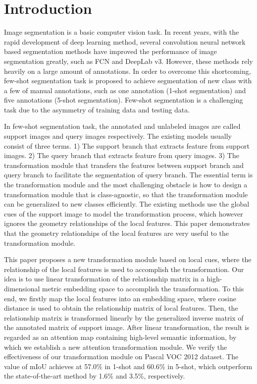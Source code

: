 \documentclass[runningheads]{llncs}
\begin{document}
\section{Introduction}

Image segmentation is a basic computer vision task\cite{ref_fcn}. In recent years, with the rapid development of deep learning method, several convolution neural network based segmentation methods have improved the performance of image segmentation greatly, such as FCN\cite{ref_fcn} and DeepLab v3\cite{ref_deeplab}. However, these methods rely heavily on a large amount of annotations. In order to overcome this shortcoming, few-shot segmentation task \cite{ref_first_one} is proposed to achieve segmentation of new class with a few of manual annotations, such as one annotation (1-shot segmentation) and five annotations (5-shot segmentation). Few-shot segmentation is a challenging task due to the asymmetry of training data and testing data.

In few-shot segmentation task, the annotated and unlabeled images are called support images and query images respectively\cite{ref_first_one}. The existing models\cite{ref_first_one}\cite{ref_conditional}\cite{ref_sgone}\cite{ref_aaai}\cite{ref_cvpr} usually consist of three terms. 1) The support branch that extracts feature from support images. 2) The query branch that extracts feature from query images. 3) The transformation module that transfers the features between support branch and query branch to facilitate the segmentation of query branch. The essential term is the transformation module and the most challenging obstacle is how to design a transformation module that is class-agnostic, so that the transformation module can be generalized to new classes efficiently. The existing methods\cite{ref_sgone}\cite{ref_cvpr} use the global cues of the support image to model the transformation process, which however ignores the geometry relationships of the local features. This paper demonstrates that the geometry relationships of the local features are very useful to the transformation module.

This paper proposes a new transformation module based on local cues, where the relationship of the local features is used to accomplish the transformation. 
Our idea is to use linear transformation of the relationship matrix in a high-dimensional metric embedding space to accomplish the transformation. 
To this end, we firstly map the local features into an embedding space, where cosine distance is used to obtain the relationship matrix of local features. Then, the relationship matrix is transformed linearly by the generalized inverse matrix of the annotated matrix of support image. After linear transformation, the result is regarded as an attention map containing high-level semantic information, by which we establish a new attention transformation module. We verify the effectiveness of our transformation module on Pascal VOC 2012 dataset\cite{ref_voc}. The value of mIoU achieves at 57.0\% in 1-shot and 60.6\% in 5-shot, which outperform the state-of-the-art method by 1.6\% and 3.5\%, respectively.
\end{document}
